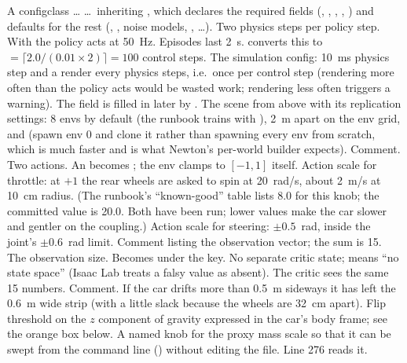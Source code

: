 \begin{explain}
 A configclass \ldots
{} \ldots\ inheriting , which declares the
  required fields (, , ,
  , ) and defaults for the rest
  (, , noise models, , \ldots).
 Two physics steps per policy step. With  the
  policy acts at 50~Hz.
 Episodes last 2~s.  converts this to
   $= \lceil 2.0 / (0.01\times2) \rceil = 100$
  control steps.
 The simulation config: 10~ms physics step and a render every
   physics steps, i.e.\ once per control step (rendering
  more often than the policy acts would be wasted work; rendering less often
  triggers a warning). The  field is filled in later by
  .
 The scene from above with its replication settings: 8 envs by
  default (the runbook trains with ), 2~m apart on the
  env grid, and  (spawn env 0 and clone it
  rather than spawning every env from scratch, which is much faster and is
  what Newton's per-world builder expects).
 Comment.
 Two actions. An  becomes ;
  the env clamps to $[-1,1]$ itself.
 Action scale for throttle: at $+1$ the rear wheels are asked to
  spin at 20~rad/s, about 2~m/s at 10~cm radius. (The runbook's
  ``known-good'' table lists 8.0 for this knob; the committed value is 20.0.
  Both have been run; lower values make the car slower and gentler on the
  coupling.)
 Action scale for steering: $\pm0.5$~rad, inside the joint's
  $\pm0.6$~rad limit.
 Comment listing the observation vector; the sum is 15.
 The observation size. Becomes  under
  the  key.
 No separate critic state;  means ``no state space''
  (Isaac Lab treats a falsy value as absent). The critic sees the same 15
  numbers.
 Comment.
 If the car drifts more than 0.5~m sideways it has left the 0.6~m
  wide strip (with a little slack because the wheels are 32~cm apart).
 Flip threshold on the $z$ component of gravity expressed in the
  car's body frame; see the orange box below.
 A named knob for the proxy mass scale so that it can be
  swept from the command line
  () without editing the file. Line 276 reads
  it.
\end{explain}

